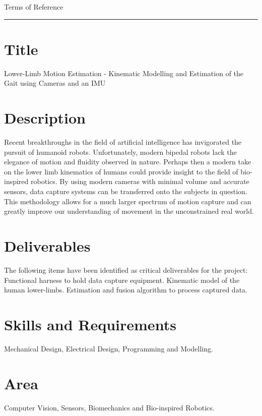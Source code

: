 \pagestyle{plain}


{\Large Terms of Reference}\\
\hrule
\vskip 5mm

\section*{Title}
Lower-Limb Motion Estimation - Kinematic Modelling and Estimation of the Gait using Cameras and an IMU
\vskip -3mm
\section*{Description}
Recent breakthroughs in the field of artificial intelligence has invigorated the pursuit of humanoid robots. Unfortunately, modern bipedal robots lack the elegance of motion and fluidity observed in nature. Perhaps then a modern take on the lower limb kinematics of humans could provide insight to the field of bio-inspired robotics. By using modern cameras with minimal volume and accurate sensors, data capture systems can be transferred onto the subjects in question. This methodology allows for a much larger spectrum of motion capture and can greatly improve our understanding of movement in the unconstrained real world.

\section*{Deliverables}
The following items have been identified as critical deliverables for the project:
Functional harness to hold data capture equipment. 
Kinematic model of the human lower-limbs.
Estimation and fusion algorithm to process captured data. 
 
\section*{Skills and Requirements}
Mechanical Design, Electrical Design, Programming and Modelling.

\section*{Area}  
Computer Vision, Sensors, Biomechanics and Bio-inspired Robotics.

